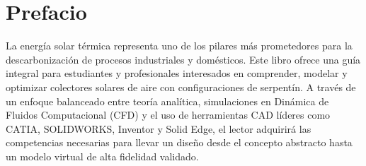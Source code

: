 \chapter*{Prefacio}

La energía solar térmica representa uno de los pilares más prometedores para la descarbonización de procesos industriales y domésticos.
Este libro ofrece una guía integral para estudiantes y profesionales interesados en comprender, modelar y optimizar colectores solares de aire con configuraciones de serpentín.
A través de un enfoque balanceado entre teoría analítica, simulaciones en Dinámica de Fluidos Computacional (CFD) y el uso de herramientas CAD líderes como CATIA, SOLIDWORKS, Inventor y Solid Edge, el lector adquirirá las competencias necesarias para llevar un diseño desde el concepto abstracto hasta un modelo virtual de alta fidelidad validado.
